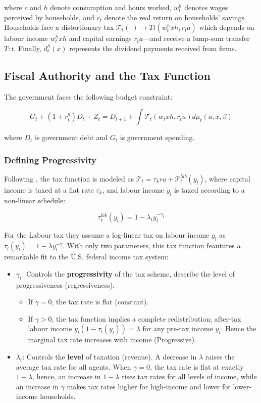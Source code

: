 \documentclass[12pt,letterpaper]{article}
\begin{document}
where $c$ and $h$ denote consumption and hours worked, $w^h_t$ denotes wages perceived by households, and $r_t$ denote the real return on households’ savings. 
Households face a distortionary tax $\mathcal{T}_t(\cdot) \xrightarrow{} Tt(w^h_txh,r_ta)$ which
depends on labour income $w^h_txh$ and capital earnings $r_ta$—and receive a lump-sum transfer $T:t$. Finally, $d^h_t(x)$ represents the dividend payments received from firms.

\subsection{Fiscal Authority and the Tax Function}
The government faces the following budget constraint:

\begin{equation}
    G_t + (1+r^g_t) D_t + Z_t = D_{t+1} + \int \mathcal{T}_t (w_t x h, r_t a) d\mu_t(a,x,\beta)
    \label{eq:gov_budget}
\end{equation}

where $D_t$ is government debt and $G_t$ is government spending.

\subsubsection{Defining Progressivity}
Following \cite{heathcote2017}, the tax function is modeled as $\mathcal{T}_t = \tau_k r a + \mathcal{T}^{lab}_t(y_l)$, where capital income is taxed at a flat rate $\tau_k$, and labour income $y_l$ is taxed according to a non-linear schedule:

\begin{equation}
    \tau^{lab}_t(y_l) = 1 - \lambda_t y_l^{-\gamma_t}
    \label{eq:hsv_tax}
\end{equation}

For the Labour tax they assume a log-linear tax on labour income $y_l$ as $\tau_l(y_l) = 1 - \lambda y^{-\gamma}_l$. With only two parameters, this tax function feautures a remarkable fit to the U.S. federal income tax system:
\begin{itemize}
    \item $\gamma_t$: Controls the \textbf{progressivity} of the tax scheme, describe the level of progressiveness (regressiveness).
    \begin{itemize}
        \item If $\gamma = 0$, the tax rate is flat (constant).
        \item If $\gamma > 0$, the tax function implies a complete redistribution; after-tax labour income $y_l(1 - \tau_l(y_l)) = \lambda$ for any pre-tax income $y_t$. Hence the marginal tax rate increases with income (Progressive).
    \end{itemize}
    \item $\lambda_t$: Controls the \textbf{level} of taxation (revenue). A decrease in $\lambda$ raises the average tax rate for all agents. When $\gamma = 0 $, the tax rate is flat at exactly $1 - \lambda$, hence, an increase in $1 - \lambda$ rises tax rates for all levels of income, while an increase in $\gamma$ makes tax rates higher for high-income and lower for lower-income households.
\end{itemize}
\end{document}
